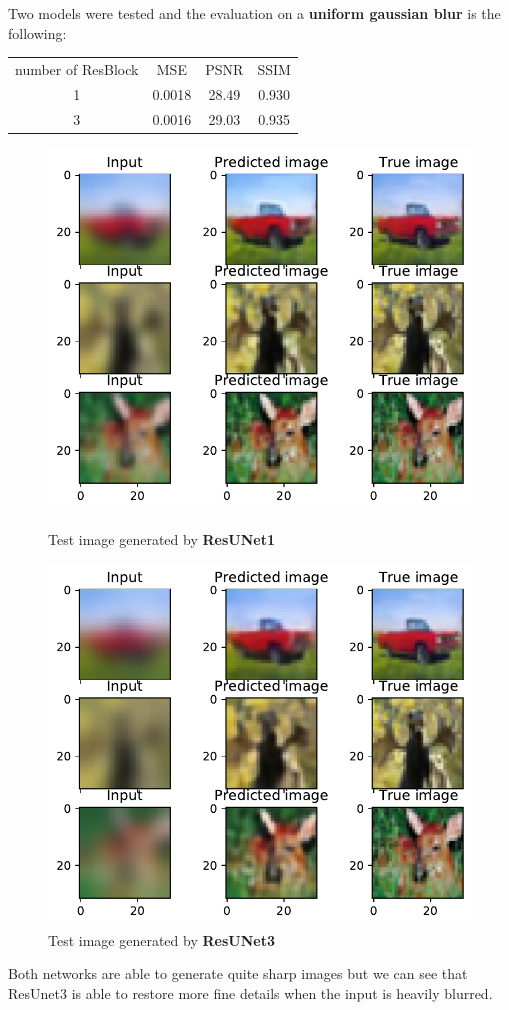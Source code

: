 Two models were tested and the evaluation on a \textbf{uniform gaussian blur} is the following:

\begin{tabularx}{300pt}{cccc}
    \centering
    number of ResBlock & MSE & PSNR & SSIM \\
    1 & 0.0018 & 28.49 & 0.930 \\
    3 & 0.0016 & 29.03 & 0.935
\end{tabularx}

\begin{figure}[H]
    \centering
    {\includegraphics[height=0.35\textheight]{subsections/resunet/resunet1test.pdf}
    \caption{Test image generated by \textbf{ResUNet1}}}
    {\centering
    \includegraphics[height=0.35\textheight]{subsections/resunet/resunet3test.pdf}
    \caption{Test image generated by \textbf{ResUNet3}}}
\end{figure}

Both networks are able to generate quite sharp images but we can see that ResUnet3 is able to restore more fine details when the input is heavily blurred. 